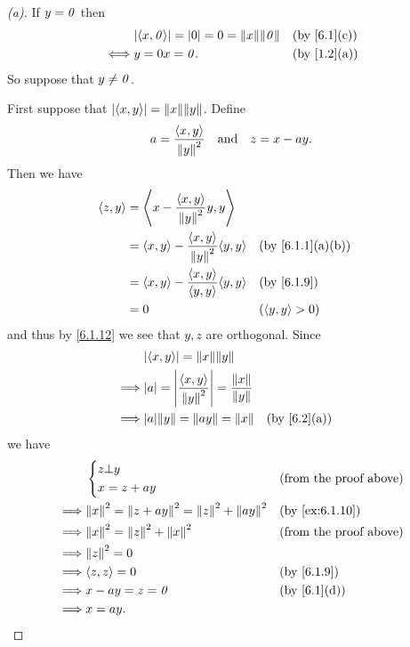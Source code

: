 \begin{proof}[(a)]
  If \(y = \mathit{0}\) then
  \begin{align*}
         & \abs{\inn{x, \zv}} = \abs{0} = 0 = \norm{x} \norm{\zv} &  & \text{(by \cref{6.1}(c))} \\
    \iff & y = 0x = \zv.                                          &  & \text{(by \cref{1.2}(a))}
  \end{align*}
  So suppose that \(y \neq \mathit{0}\).

  First suppose that \(\abs{\inn{x, y}} = \norm{x} \norm{y}\).
  Define
  \[
    a = \frac{\left\langle x, y\right\rangle}{\left\lVert y\right\rVert^2} \quad \text{and} \quad z = x - ay.
  \]
  Then we have
  \begin{align*}
    \inn{z, y} & = \inn{x - \frac{\inn{x, y}}{\norm{y}^2} y, y}                                              \\
               & = \inn{x, y} - \frac{\inn{x, y}}{\norm{y}^2} \inn{y, y} &  & \text{(by \cref{6.1.1}(a)(b))} \\
               & = \inn{x, y} - \frac{\inn{x, y}}{\inn{y, y}} \inn{y, y} &  & \text{(by \cref{6.1.9})}       \\
               & = 0                                                     &  & (\inn{y, y} > 0)
  \end{align*}
  and thus by \cref{6.1.12} we see that \(y, z\) are orthogonal.
  Since
  \begin{align*}
             & \abs{\inn{x, y}} = \norm{x} \norm{y}                                                                     \\
    \implies & \abs{a} = \abs{\frac{\inn{x, y}}{\norm{y}^2}} = \frac{\norm{x}}{\norm{y}}                                \\
    \implies & \abs{a} \norm{y} = \norm{ay} = \norm{x}                                   &  & \text{(by \cref{6.2}(a))} \\
  \end{align*}
  we have
  \begin{align*}
             & \begin{dcases}
                 z \bot y \\
                 x = z + ay
               \end{dcases}                                          &  & \text{(from the proof above)}   \\
    \implies & \norm{x}^2 = \norm{z + ay}^2 = \norm{z}^2 + \norm{ay}^2 &  & \text{(by \cref{ex:6.1.10})}  \\
    \implies & \norm{x}^2 = \norm{z}^2 + \norm{x}^2                    &  & \text{(from the proof above)} \\
    \implies & \norm{z}^2 = 0                                                                             \\
    \implies & \inn{z, z} = 0                                          &  & \text{(by \cref{6.1.9})}      \\
    \implies & x - ay = z = \zv                                        &  & \text{(by \cref{6.1}(d))}     \\
    \implies & x = ay.
  \end{align*}


\end{proof}
